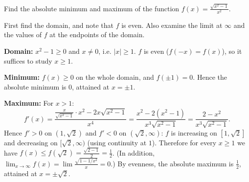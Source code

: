 
\begin{question}
Find the absolute minimum and maximum of the function $f(x)=\frac{\sqrt{x^2-1}}{x^2}$.
\end{question}

\begin{hint}
First find the domain, and note that $f$ is even. Also examine the limit at $\infty$ and the values of $f$ at the endpoints of the domain.
\end{hint}

\begin{solution}
\textbf{Domain:} $x^2-1\ge0$ and $x\ne0$, i.e. $|x|\ge1$. $f$ is even ($f(-x)=f(x)$), so it suffices to study $x\ge1$.

\textbf{Minimum:} $f(x)\ge0$ on the whole domain, and $f(\pm1)=0$. Hence the absolute minimum is $\boxed{0}$, attained at $x=\pm1$.

\textbf{Maximum:} For $x>1$:
\[ f'(x)=\frac{\frac{x}{\sqrt{x^2-1}}\cdot x^2-2x\sqrt{x^2-1}}{x^4}=\frac{x^2-2(x^2-1)}{x^3\sqrt{x^2-1}}=\frac{2-x^2}{x^3\sqrt{x^2-1}}. \]
Hence $f'>0$ on $(1,\sqrt2)$ and $f'<0$ on $(\sqrt2,\infty)$: $f$ is increasing on $[1,\sqrt2]$ and decreasing on $[\sqrt2,\infty)$ (using continuity at $1$). Therefore for every $x\ge1$ we have $f(x)\le f(\sqrt2)=\frac{\sqrt{2-1}}{2}=\frac12$. (In addition, $\lim_{x\to\infty}f(x)=\lim\frac{\sqrt{1-1/x^2}}{x}=0$.)
By evenness, the absolute maximum is $\boxed{\frac12}$, attained at $x=\pm\sqrt2$.
\end{solution}
